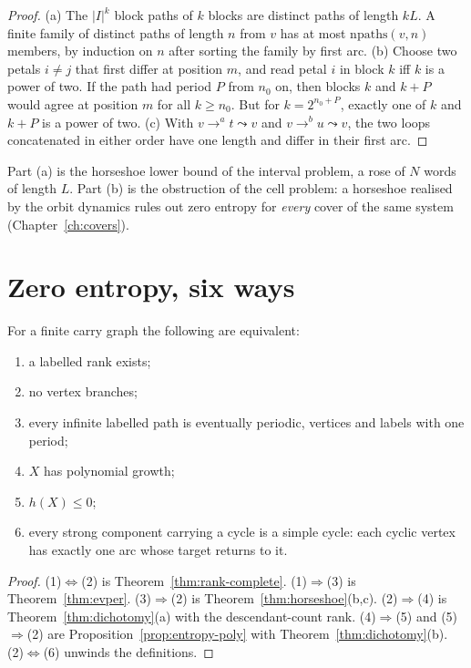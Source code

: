 \begin{proof}
(a) The \(|I|^k\) block paths of \(k\) blocks are distinct paths of length \(kL\). A finite
family of distinct paths of length \(n\) from \(v\) has at most \(\mathrm{npaths}(v,n)\)
members, by induction on \(n\) after sorting the family by first arc. (b) Choose two petals
\(i\neq j\) that first differ at position \(m\), and read petal \(i\) in block \(k\) iff \(k\) is
a power of two. If the path had period \(P\) from \(n_0\) on, then blocks \(k\) and \(k+P\) would
agree at position \(m\) for all \(k\ge n_0\). But for \(k=2^{n_0+P}\), exactly one of \(k\) and
\(k+P\) is a power of two. (c) With \(v\to^a t\leadsto v\) and \(v\to^b u\leadsto v\), the two
loops concatenated in either order have one length and differ in their first arc.
\end{proof}

Part (a) is the horseshoe lower bound of the interval problem, a rose of \(N\) words of length
\(L\). Part (b) is the obstruction of the cell problem: a horseshoe realised by the orbit
dynamics rules out zero entropy for \emph{every} cover of the same system
(Chapter~\ref{ch:covers}).

\section{Zero entropy, six ways}

\begin{theorem}\label{thm:six-faces}
For a finite carry graph the following are equivalent:
\begin{enumerate}[label=(\arabic*)]
\item a labelled rank exists;
\item no vertex branches;
\item every infinite labelled path is eventually periodic, vertices and labels with one period;
\item \(X\) has polynomial growth;
\item \(h(X)\le0\);
\item every strong component carrying a cycle is a simple cycle: each cyclic vertex has exactly
  one arc whose target returns to it.
\end{enumerate}
\end{theorem}

\begin{proof}
(1)\(\Leftrightarrow\)(2) is Theorem~\ref{thm:rank-complete}. (1)\(\Rightarrow\)(3) is
Theorem~\ref{thm:evper}. (3)\(\Rightarrow\)(2) is Theorem~\ref{thm:horseshoe}(b,c).
(2)\(\Rightarrow\)(4) is Theorem~\ref{thm:dichotomy}(a) with the descendant-count rank.
(4)\(\Rightarrow\)(5) and (5)\(\Rightarrow\)(2) are Proposition~\ref{prop:entropy-poly} with
Theorem~\ref{thm:dichotomy}(b). (2)\(\Leftrightarrow\)(6) unwinds the definitions.
\end{proof}

